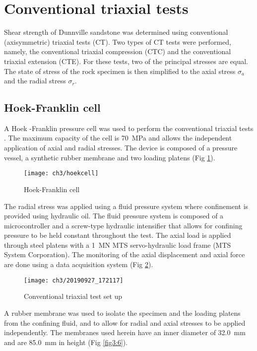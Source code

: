 \section{Conventional triaxial tests}\label{Conventional_Triaxial_tests}

Shear strength of Dunnville sandstone was determined using conventional (axisymmetric) triaxial tests (CT). Two types of CT tests were performed, namely, the conventional triaxial compression (CTC) and the conventional triaxial extension (CTE). For these tests, two of the principal stresses are equal. The state of stress of the rock specimen is then simplified to the axial stress $\sigma_a$ and the radial stress $\sigma_r$. 

\subsection{Hoek-Franklin cell}

A Hoek -Franklin pressure cell was used to perform the conventional triaxial tests \cite{Franklin1970}. The maximum capacity of the cell is \SI{70}{MPa} and allows the independent application of axial and radial stresses. The device is composed of a pressure vessel, a synthetic rubber membrane and two loading platens (Fig \ref{fig3:4}).

\begin{figure}[tb]
    \centering
    \texttt{[image: ch3/hoekcell]}
    \caption{Hoek-Franklin cell}
    \label{fig3:4}
\end{figure} 

The radial stress was applied using a fluid pressure system where confinement is provided using hydraulic oil. The fluid pressure system is composed of a microcontroller and a screw-type hydraulic intensifier that allows for confining pressure to be held constant throughout the test. The axial load is applied through steel platens with a \SI{1}{\mega\newton} MTS servo-hydraulic load frame (MTS System Corporation). The monitoring of the axial displacement and axial force are done using a data acquisition system (Fig \ref{fig3:5}).

\begin{figure}[tb]
    \centering
    \texttt{[image: ch3/20190927\_172117]}
    \caption{Conventional triaxial test set up}
    \label{fig3:5}
\end{figure} 

A rubber membrane was used to isolate the specimen and the loading platens from the confining fluid, and to allow for radial and axial stresses to be applied independently. The membranes used herein have an inner diameter of \SI{32.0}{mm} and are \SI{85.0}{mm} in height (Fig \ref{fig3:6}).

